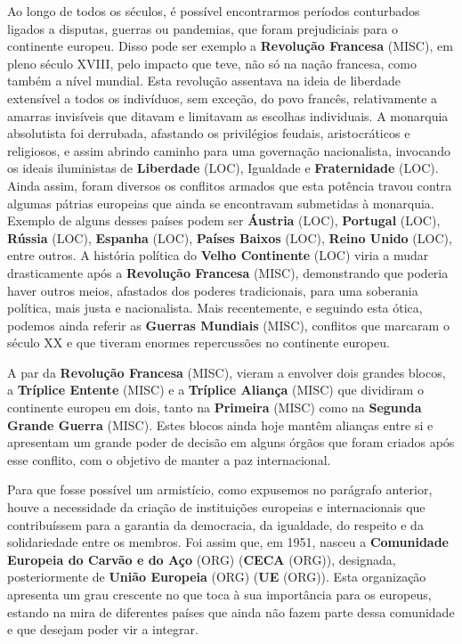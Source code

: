 \documentclass[12pt,a4paper]{article}
\begin{document}
Ao  longo  de  todos  os  séculos,  é  possível  encontrarmos  períodos  conturbados ligados  a  disputas,  guerras  ou  pandemias,  que  foram  prejudiciais  para  o  continente europeu.  Disso  pode  ser  exemplo  a  \textbf{Revolução  Francesa} (MISC),  em  pleno  século  XVIII,  pelo impacto  que  teve,  não  só  na  nação  francesa,  como  também  a  nível  mundial.  Esta revolução assentava na ideia de liberdade extensível a todos os indivíduos, sem exceção, do povo francês, relativamente a amarras invisíveis que ditavam e limitavam as escolhas individuais.  A  monarquia  absolutista  foi  derrubada,  afastando  os  privilégios  feudais, aristocráticos e religiosos, e assim abrindo caminho para uma governação nacionalista, invocando  os  ideais  iluministas  de  \textbf{Liberdade} (LOC),  Igualdade  e  \textbf{Fraternidade} (LOC).  Ainda  assim, foram  diversos  os  conflitos  armados  que  esta  potência  travou  contra  algumas  pátrias europeias que ainda se encontravam submetidas à monarquia. Exemplo de alguns desses países podem ser \textbf{Áustria} (LOC), \textbf{Portugal} (LOC), \textbf{Rússia} (LOC), \textbf{Espanha} (LOC), \textbf{Países Baixos} (LOC), \textbf{Reino Unido} (LOC), entre outros.  A  história  política  do  \textbf{Velho  Continente} (LOC)  viria  a  mudar  drasticamente  após  a \textbf{Revolução  Francesa} (MISC),  demonstrando  que  poderia  haver  outros  meios,  afastados  dos poderes  tradicionais,  para  uma  soberania  política,  mais  justa  e  nacionalista.  Mais recentemente, e seguindo esta ótica, podemos ainda referir as \textbf{Guerras Mundiais} (MISC), conflitos que marcaram o século XX e que tiveram enormes repercussões no continente europeu.

A par da \textbf{Revolução Francesa} (MISC), vieram a envolver dois grandes blocos, a \textbf{Tríplice Entente} (MISC) e a \textbf{Tríplice Aliança} (MISC) que dividiram o continente europeu em dois, tanto na \textbf{Primeira} (MISC) como na  \textbf{Segunda  Grande  Guerra} (MISC).  Estes  blocos  ainda  hoje  mantêm  alianças  entre  si  e apresentam um grande poder de decisão em alguns órgãos que foram criados após esse conflito, com o objetivo de manter a paz internacional.

Para  que  fosse  possível  um  armistício,  como  expusemos  no  parágrafo  anterior, houve  a  necessidade  da  criação  de  instituições  europeias  e  internacionais  que contribuíssem para a garantia da democracia, da igualdade, do respeito e da solidariedade entre os membros. Foi assim que, em 1951, nasceu a \textbf{Comunidade Europeia do Carvão e do Aço} (ORG) (\textbf{CECA} (ORG)), designada, posteriormente de \textbf{União Europeia} (ORG) (\textbf{UE} (ORG)).  Esta organização apresenta um grau crescente no que toca à sua importância para os europeus, estando na mira  de  diferentes  países  que  ainda  não  fazem  parte  dessa  comunidade  e  que  desejam poder vir a integrar.
\end{document}
